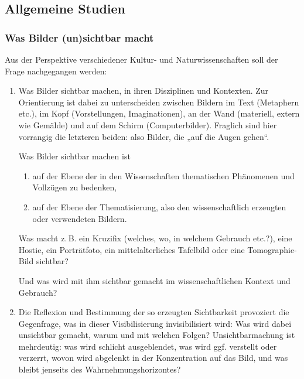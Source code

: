 \documentclass[%
a4paper, %
11pt,               %
leqno,              %
fleqn,              %
]
{scrartcl}
\begin{document}


\subsection{Allgemeine Studien} %
\label{sub:Allgemeine Studien}

\subsubsection{Was Bilder (un)sichtbar macht} %
\label{ssub:Was Bilder (un)sichtbar macht}

Aus der Perspektive verschiedener Kultur- und Naturwissenschaften soll der Frage
nachgegangen werden:
\begin{enumerate}
  \item Was Bilder sichtbar machen, in ihren Disziplinen und Kontexten. Zur
    Orientierung ist dabei zu unterscheiden zwischen Bildern im Text (Metaphern
    etc.), im Kopf (Vorstellungen, Imaginationen), an der Wand (materiell,
    extern wie Gemälde) und auf dem Schirm (Computerbilder). Fraglich sind hier
    vorrangig die letzteren beiden: also Bilder, die „auf die Augen gehen“.

    Was Bilder sichtbar machen ist
    \begin{enumerate}
      \item auf der Ebene der in den Wissenschaften thematischen Phänomenen und
        Vollzügen zu bedenken,
      \item auf der Ebene der Thematisierung, also den wissenschaftlich
        erzeugten oder verwendeten Bildern.
    \end{enumerate}
    Was macht z.\,B. ein Kruzifix (welches, wo, in welchem Gebrauch etc.?), eine
    Hostie, ein Porträtfoto, ein mittelalterliches Tafelbild oder eine
    Tomographie-Bild sichtbar?

    Und was wird mit ihm sichtbar gemacht im wissenschaftlichen Kontext und
    Gebrauch?
  \item Die Reflexion und Bestimmung der so erzeugten Sichtbarkeit provoziert
    die Gegenfrage, was in dieser Visibilisierung invisibilisiert wird: Was wird
    dabei unsichtbar gemacht, warum und mit welchen Folgen? Unsichtbarmachung
    ist mehrdeutig: was wird schlicht ausgeblendet, was wird ggf. verstellt oder
    verzerrt, wovon wird abgelenkt in der Konzentration auf das Bild, und was
    bleibt jenseits des Wahrnehmungshorizontes?


\end{enumerate}
\end{document}
